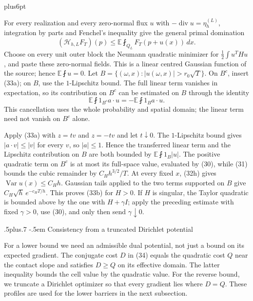 \documentclass[11pt,reqno]{amsart}
\makeatletter
\def\subsection{\@startsection{subsection}{2}{0pt}%
  {.5\linespacing plus.7\linespacing}
  {-.5em}
  {\normalfont\scshape}}
\theoremstyle{plain}
\theoremstyle{definition}
\theoremstyle{remark}
\renewenvironment{proof}[1][\proofname]{%
  \par
  \pushQED{\qed}%
  \normalfont
  \topsep6pt plus6pt\relax
  \trivlist
  \item[\hskip\labelsep\slshape #1\@addpunct{.}]%
  \ignorespaces
}{%
  \popQED
  \endtrivlist
  \@endpefalse
}
\DeclareRobustCommand{\qed}{%
  \leavevmode\unskip\penalty9999\hbox{}\nobreak
  \ifmmode
    \makebox[0pt][l]{\qquad\hbox{\qedsymbol}}%
  \else
    \qquad\hbox{\qedsymbol}%
  \fi
}
\renewcommand{\qedsymbol}{\rule[.47pt]{4pt}{6pt}}
\numberwithin{equation}{section}
\newcommand{\1}{\mathbf 1}
\makeatother
\begin{document}
\begin{proof}
For every realization and every zero-normal flux $u$ with
$-\operatorname {div}u=\eta_ h^{(L)}$, integration by parts and
Fenchel's inequality give the general primal domination
\begin{equation}
(\mathcal H_ {h,L}F_ T)(p)
\leq\mathbb E\fint_ {Q_ L}F_ T(p+u(x))\,dx.
\tag{33c}
\end{equation}
Choose on every unit outer block the Neumann quadratic minimizer for
$\frac12\int u^THu$, and paste these zero-normal fields.  This is a
linear centred Gaussian function of the source; hence
$\mathbb E\fint u=0$.  Let
$B=\{(\omega,x):|u(\omega,x)|>r_ 0\sqrt T\}$.  On $B^c$, insert
(33a); on $B$, use the $1$-Lipschitz bound.  The full linear term
vanishes in expectation, so its contribution on $B^c$ can be estimated
on $B$ through the identity
\begin{equation*}
\mathbb E\fint 1_ {B^c}a\cdot u
=-\mathbb E\fint1_ Ba\cdot u.
\end{equation*}
This cancellation uses the whole probability and spatial domain; the
linear term need not vanish on $B^c$ alone.

Apply (33a) with $z=tv$ and $z=-tv$ and let $t\downarrow0$.
The $1$-Lipschitz bound gives $|a\cdot v|\leq|v|$ for every $v$,
so $|a|\leq1$.
Hence the transferred linear term and the Lipschitz contribution on
$B$ are both bounded by $\mathbb E\fint1_ B|u|$.  The positive
quadratic term on $B^c$ is at most its full-space value, evaluated by
(30), while (31) bounds the cubic remainder by $C_ Hh^{3/2}/T$.
At every fixed $x$, (32h) gives
$\operatorname {Var}u(x)\leq C_ Hh$.  Gaussian tails applied to the two
terms supported on $B$ give
$C_ H\sqrt h\,e^{-c_ HT/h}$.  This proves (33b) for $H>0$.  If $H$ is singular,
the Taylor quadratic is bounded above by the one with $H+\gamma I$;
apply the preceding estimate with fixed $\gamma>0$, use (30), and only
then send $\gamma\downarrow0$.

\end{proof}

\subsection{Consistency from a truncated Dirichlet potential}

For a lower bound we need an admissible dual potential, not just a
bound on its expected gradient.  The conjugate cost $D$ in (34) equals
the quadratic cost $Q$ near the contact slope and satisfies $D\geq Q$
on its effective domain.  The latter inequality bounds the cell value
by the quadratic value.  For the reverse bound, we truncate a
Dirichlet optimizer so that every gradient lies where $D=Q$.
These profiles are used for the lower barriers in the next subsection.
\end{document}
